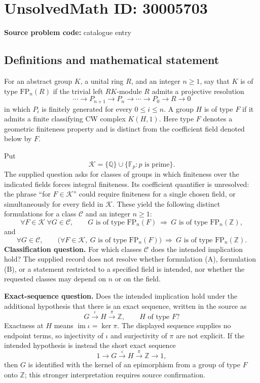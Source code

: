 \documentclass[11pt]{article}
\newcommand{\Z}{\mathbb{Z}}
\newcommand{\Q}{\mathbb{Q}}
\newcommand{\F}{\mathbb{F}}
\begin{document}
\section*{UnsolvedMath ID: 30005703}
\textbf{Source problem code:} catalogue entry
\subsection{Definitions and mathematical statement}
For an abstract group \(K\), a unital ring \(R\), and an integer \(n\geq 1\), say that \(K\) is of type \(\mathrm{FP}_n(R)\) if the trivial left \(RK\)-module \(R\) admits a projective resolution
\[
\cdots\longrightarrow P_{n+1}\longrightarrow P_n\longrightarrow\cdots\longrightarrow P_0\longrightarrow R\longrightarrow 0
\]
in which \(P_i\) is finitely generated for every \(0\leq i\leq n\). A group \(H\) is of type \(F\) if it admits a finite classifying CW complex \(K(H,1)\). Here type \(F\) denotes a geometric finiteness property and is distinct from the coefficient field denoted below by \(F\).

Put
\[
\mathcal K=\{\Q\}\cup\{\F_p:p\text{ is prime}\}.
\]
The supplied question asks for classes of groups in which finiteness over the indicated fields forces integral finiteness. Its coefficient quantifier is unresolved: the phrase ``for \(F\in\mathcal K\)'' could require finiteness for a single chosen field, or simultaneously for every field in \(\mathcal K\). These yield the following distinct formulations for a class \(\mathcal C\) and an integer \(n\geq1\):
\[
\forall F\in\mathcal K\ \forall G\in\mathcal C,\qquad
G\text{ is of type }\mathrm{FP}_n(F)
\ \Longrightarrow\
G\text{ is of type }\mathrm{FP}_n(\Z),
\tag{A}
\]
and
\[
\forall G\in\mathcal C,\qquad
\bigl(\forall F\in\mathcal K,\ G\text{ is of type }\mathrm{FP}_n(F)\bigr)
\ \Longrightarrow\
G\text{ is of type }\mathrm{FP}_n(\Z).
\tag{B}
\]
\textbf{Classification question.} For which classes \(\mathcal C\) does the intended implication hold? The supplied record does not resolve whether formulation (A), formulation (B), or a statement restricted to a specified field is intended, nor whether the requested classes may depend on \(n\) or on the field.

\textbf{Exact-sequence question.} Does the intended implication hold under the additional hypothesis that there is an exact sequence, written in the source as
\[
G\xrightarrow{\iota}H\xrightarrow{\pi}\Z,
\qquad H\text{ of type }F?
\]
Exactness at \(H\) means \(\operatorname{im}\iota=\ker\pi\). The displayed sequence supplies no endpoint terms, so injectivity of \(\iota\) and surjectivity of \(\pi\) are not explicit. If the intended hypothesis is instead the short exact sequence
\[
1\longrightarrow G\xrightarrow{\iota}H\xrightarrow{\pi}\Z\longrightarrow 1,
\]
then \(G\) is identified with the kernel of an epimorphism from a group of type \(F\) onto \(\Z\); this stronger interpretation requires source confirmation.
\end{document}
